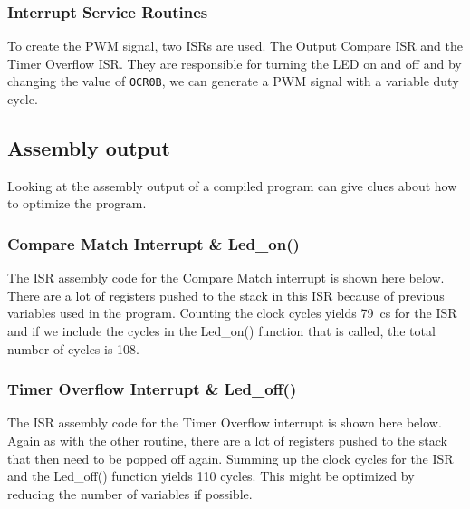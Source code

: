 \documentclass[11pt,a4paper,titlepage]{article}
\begin{document}
	
	
	\subsubsection{Interrupt Service Routines}
	
	To create the PWM signal, two ISRs are used. The Output Compare ISR and the Timer Overflow ISR. They are responsible for turning the LED on and off and by changing the value of \verb|OCR0B|, we can generate a PWM signal with a variable duty cycle.
	
	
	
	
	\subsection{Assembly output}
	Looking at the assembly output of a compiled program can give clues about how to optimize the program.
	\subsubsection{Compare Match Interrupt \& Led\_on()}
	The ISR assembly code for the Compare Match interrupt is shown here below.  There are a lot of registers pushed to the stack in this ISR because of previous variables used in the program. Counting the clock cycles yields 79~cs for the ISR and if we include the cycles in the Led\_on() function that is called, the total number of cycles is 108. 
	
	
	
	\subsubsection{Timer Overflow Interrupt \& Led\_off()}
	The ISR assembly code for the Timer Overflow interrupt is shown here below. Again as with the other routine, there are a lot of registers pushed to the stack that then need to be popped off again. Summing up the clock cycles for the ISR and the Led\_off() function yields 110 cycles. This might be optimized by reducing the number of variables if possible.
	
\end{document}
